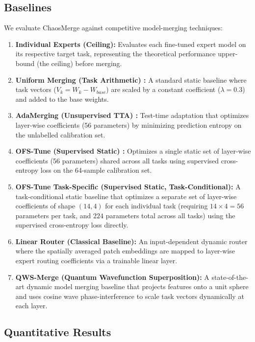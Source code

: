 \subsection{Baselines}
We evaluate ChaosMerge against competitive model-merging techniques:
\begin{enumerate}
    \item \textbf{Individual Experts (Ceiling):} Evaluates each fine-tuned expert model on its respective target task, representing the theoretical performance upper-bound (the ceiling) before merging.
    \item \textbf{Uniform Merging (Task Arithmetic) \cite{ilharco2022editing}:} A standard static baseline where task vectors ($V_k = W_k - W_{base}$) are scaled by a constant coefficient ($\lambda=0.3$) and added to the base weights.
    \item \textbf{AdaMerging (Unsupervised TTA) \cite{yang2023adamerging}:} Test-time adaptation that optimizes layer-wise coefficients (56 parameters) by minimizing prediction entropy on the unlabelled calibration set.
    \item \textbf{OFS-Tune (Supervised Static) \cite{trial3_submission2}:} Optimizes a single static set of layer-wise coefficients (56 parameters) shared across all tasks using supervised cross-entropy loss on the 64-sample calibration set.
    \item \textbf{OFS-Tune Task-Specific (Supervised Static, Task-Conditional):} A task-conditional static baseline that optimizes a separate set of layer-wise coefficients of shape $(14, 4)$ for each individual task (requiring $14 \times 4 = 56$ parameters per task, and $224$ parameters total across all tasks) using the supervised cross-entropy loss directly.
    \item \textbf{Linear Router (Classical Baseline):} An input-dependent dynamic router where the spatially averaged patch embeddings are mapped to layer-wise expert routing coefficients via a trainable linear layer.
    \item \textbf{QWS-Merge (Quantum Wavefunction Superposition):} A state-of-the-art dynamic model merging baseline that projects features onto a unit sphere and uses cosine wave phase-interference to scale task vectors dynamically at each layer.
\end{enumerate}

\subsection{Quantitative Results}
\label{subsec:results}

